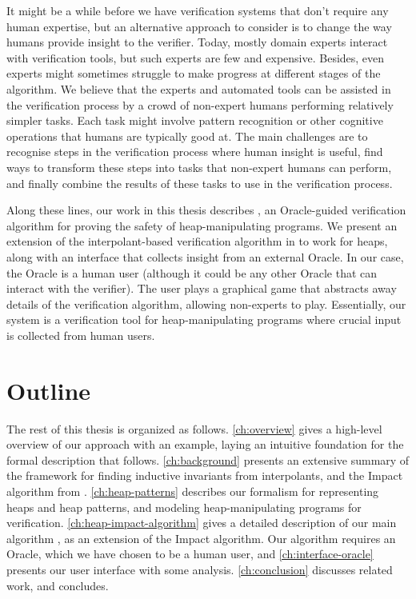 It might be a while before we have verification systems that don't require any human expertise, but an alternative approach to consider is to change the way humans provide insight to the verifier. Today, mostly domain experts interact with verification tools, but such experts are few and expensive. Besides, even experts might sometimes struggle to make progress at different stages of the algorithm. We believe that the experts and automated tools can be assisted in the verification process by a crowd of non-expert humans performing relatively simpler tasks. Each task might involve pattern recognition or other cognitive operations that humans are typically good at. The main challenges are to recognise steps in the verification process where human insight is useful, find ways to transform these steps into tasks that non-expert humans can perform, and finally combine the results of these tasks to use in the verification process.

Along these lines, our work in this thesis describes \verifier, an Oracle-guided verification algorithm for proving the safety of heap-manipulating programs. We present an extension of the interpolant-based verification algorithm in \cite{mcmillan06} to work for heaps, along with an interface that collects insight from an external Oracle. In our case, the Oracle is a human user (although it could be any other Oracle that can interact with the verifier). The user plays a graphical game that abstracts away details of the verification algorithm, allowing non-experts to play. Essentially, our system is a verification tool for heap-manipulating programs where crucial input is collected from human users.

\section{Outline}

The rest of this thesis is organized as follows. \autoref{ch:overview} gives a high-level overview of our approach with an example, laying an intuitive foundation for the formal description that follows. \autoref{ch:background} presents an extensive summary of the framework for finding inductive invariants from interpolants, and the Impact algorithm from \cite{mcmillan06}. \autoref{ch:heap-patterns} describes our formalism for representing heaps and heap patterns, and modeling heap-manipulating programs for verification. \autoref{ch:heap-impact-algorithm} gives a detailed description of our main algorithm \verifier, as an extension of the Impact algorithm. Our algorithm requires an Oracle, which we have chosen to be a human user, and \autoref{ch:interface-oracle} presents our user interface with some analysis. \autoref{ch:conclusion} discusses related work, and concludes.

